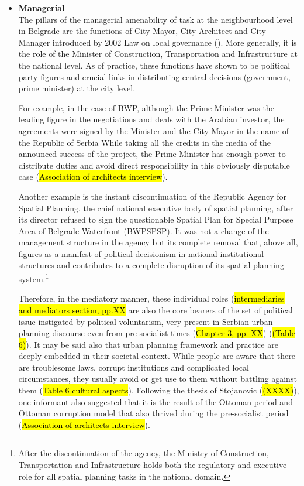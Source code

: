 \documentclass[11pt]{report}
\begin{document}
\begin{itemize}
\item \textbf{Managerial}
\\
The pillars of the managerial amenability of task at the neighbourhood level in Belgrade are the functions of City Mayor, City Architect and City Manager introduced by 2002 Law on local governance (\cite{Vujovic and Petrovic, 2007}).
More generally, it is the role of the Minister of Construction, Transportation and Infrastructure at the national level.
As of practice, these functions have shown to be political party figures and crucial links in distributing central decisions (government, prime minister) at the city level.

For example, in the case of BWP, although the Prime Minister was the leading figure in the negotiations and deals with the Arabian investor, the agreements were signed by the Minister and the City Mayor in the name of the Republic of Serbia
While taking all the credits in the media of the announced success of the project, the Prime Minister has enough power to distribute duties and avoid direct responsibility in this obviously disputable case (\hl{Association of architects interview}).

Another example is the instant discontinuation of the Republic Agency for Spatial Planning, the chief national executive body of spatial planning, after its director refused to sign the questionable Spatial Plan for Special Purpose Area of Belgrade Waterfront (BWPSPSP). It was not a change of the management structure in the agency but its complete removal that, above all, figures as a manifest of political decisionism in national institutional structures and contributes to a complete disruption of its spatial planning system.\footnote{After the discontinuation of the agency, the Ministry of Construction, Transportation and Infrastructure holds both the regulatory and executive role for all spatial planning tasks in the national domain.}

Therefore, in the mediatory manner, these individual roles (\hl{intermediaries and mediators section, pp.XX} are also the core bearers of the set of political issue  instigated by political voluntarism, very present in Serbian urban planning discourse even from pre-socialist times (\hl{Chapter 3, pp. XX}) (\hl{(Table 6)}).
It may be said also that urban planning framework and practice are deeply embedded in their societal context.
While people are aware that there are troublesome laws, corrupt institutions and complicated local circumstances, they usually avoid or get use to them without battling against them (\hl{Table 6 cultural aspects}).
Following the thesis of Stojanovic (\hl{(XXXX)}), one informant also suggested that it is the result of the Ottoman period and Ottoman corruption model that also thrived during the pre-socialist period (\hl{Association of architects  interview}).
\\


\end{itemize}
\end{document}
